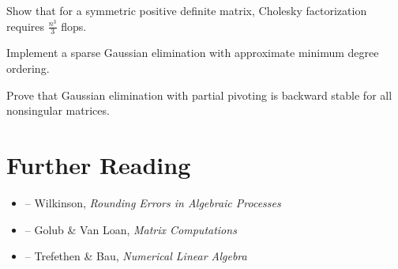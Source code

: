 \begin{exercise}
Show that for a symmetric positive definite matrix, Cholesky factorization  requires $\frac{n^3}{3}$ flops.
\end{exercise}

\begin{exercise}
Implement a sparse Gaussian elimination with approximate minimum degree ordering.
\end{exercise}

\begin{exercise}
Prove that Gaussian elimination with partial pivoting is backward stable for all nonsingular matrices.
\end{exercise}

\section{Further Reading}

\begin{itemize}
    \item \cite{wilkinson} -- Wilkinson, \textit{Rounding Errors in Algebraic Processes}
    \item \cite{golub-vanloan} -- Golub \& Van Loan, \textit{Matrix Computations}
    \item \cite{trefethen-bau} -- Trefethen \& Bau, \textit{Numerical Linear Algebra}
\end{itemize}
